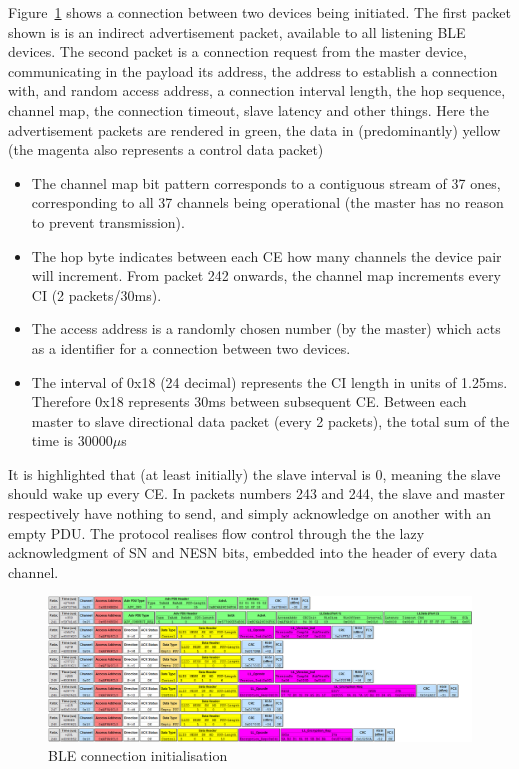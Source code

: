 \documentclass[]{article}
\begin{document}
Figure~\ref{fig:connection} shows a connection between two devices being initiated. The first packet shown is is an indirect advertisement packet, available to all listening \ac{BLE} devices. The second packet is a connection request from the master device, communicating in the payload its address, the address to establish a connection with, and random access address, a connection interval length, the hop sequence, channel map, the connection timeout, slave latency and other things. Here the advertisement packets are rendered in green, the data in (predominantly) yellow (the magenta also represents a control data packet)
\begin{itemize}

 \item The channel map bit pattern corresponds to a contiguous stream of 37 ones, corresponding to all 37 channels being operational (the master has no reason to prevent transmission). 
 \item The hop byte indicates between each \ac{CE} how many channels the device pair will increment. From packet 242 onwards, the channel map increments every \ac{CI} (2 packets/30ms).
 \item The access address is a randomly chosen number (by the master) which acts as a identifier for a connection between two devices. 
 \item The interval of 0x18 (24 decimal) represents the \ac{CI} length in units of 1.25ms. Therefore 0x18 represents 30ms between subsequent \ac{CE}. Between each master to slave directional data packet (every 2 packets), the total sum of the time is 30000$\mu$s

\end{itemize}

It is highlighted that (at least initially) the slave interval is 0, meaning the slave should wake up every \ac{CE}. In packets numbers 243 and 244, the slave and master respectively have nothing to send, and simply acknowledge on another with an empty \ac{PDU}. The protocol realises flow control through the the lazy acknowledgment of \ac{SN} and \ac{NESN} bits, embedded into the header of every data channel.

\begin{figure}[!h]
	\begin{center}
		\includegraphics[width = 1.4\textwidth, angle=90]{connection}
	\end{center}
	\caption{\ac{BLE} connection initialisation}
	\label{fig:connection}
\end{figure}
\end{document}
